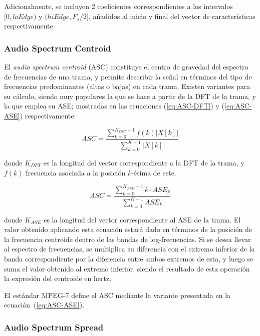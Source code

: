 Adicionalmente, se incluyen 2 coeficientes correspondientes a los intervalos $[0, loEdge)$ y $(hiEdge, F_s/2]$, añadidos al inicio y final del vector de características respectivamente.

\subsubsection{Audio Spectrum Centroid}

El \textit{audio spectrum centroid} (ASC) constituye el centro de gravedad del espectro de frecuencias de una trama, y permite describir la señal en términos del tipo de frecuencias predominantes (altas o bajas) en cada trama.
Existen variantes para su cálculo, siendo muy populares la que se hace a partir de la DFT de la trama, y la que emplea su ASE;
mostradas en las ecuaciones (\ref{eq:ASC-DFT}) y (\ref{eq:ASC-ASE}) respectivamente:

\begin{equation}
    \label{eq:ASC-DFT}
    ASC = \frac{\sum_{k=0}^{K_{DFT}-1}{f(k)|X[k]|}}{\sum_{k=0}^{K-1}{|X[k]|}}
\end{equation}

\noindent
donde $K_{DFT}$ es la longitud del vector correspondiente a la DFT de la trama, y $f(k)$ frecuencia asociada a la posición $k$-ésima de este.

\begin{equation}
    \label{eq:ASC-ASE}
    ASC = \frac{\sum_{k=0}^{K_{ASE}-1}{k\cdot ASE_k}}{\sum_{k=0}^{K-1}{ASE_k}}
\end{equation}

\noindent
donde $K_{ASE}$ es la longitud del vector correspondiente al ASE de la trama.
El valor obtenido aplicando esta ecuación estará dado en términos de la posición de la frecuencia centroide dentro de las bandas de log-frecuencias.
Si se desea llevar al espectro de frecuencias, se multiplica su diferencia con el extremo inferior de la banda correspondiente por la diferencia entre ambos extremos de esta, y luego se suma el valor obtenido al extremo inferior, siendo el resultado de esta operación la expresión del centroide en hertz.

El estándar MPEG-7 define el ASC mediante la variante presentada en la ecuación~(\ref{eq:ASC-ASE}).

\subsubsection{Audio Spectrum Spread}

